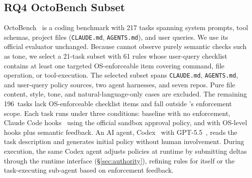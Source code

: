 \subsection{RQ4 OctoBench Subset}
\label{sec:supp:setup:rq4}
OctoBench~\cite{octobench} is a coding benchmark with 217 tasks spanning system prompts, tool schemas, project files (\texttt{CLAUDE.md}, \texttt{AGENTS.md}), and user queries. We use its official evaluator unchanged.
Because \sys{} cannot observe purely semantic checks such as tone, we select a 21-task subset with 61 rules whose user-query checklist contains at least one targeted OS-enforceable item covering command, file operation, or tool-execution.
The selected subset spans \texttt{CLAUDE.md}, \texttt{AGENTS.md}, and user-query policy sources, two agent harnesses, and seven repos.
Pure file content, style, tone, and natural-language-only cases are excluded.
The remaining 196~tasks lack OS-enforceable checklist items and fall outside \sys{}'s enforcement scope.
Each task runs under three conditions: baseline with no enforcement, Claude Code hooks~\cite{anthropic2026hooks} using the official sandbox approval policy, and \sys{} with OS-level hooks plus semantic feedback.
An AI agent, Codex~\cite{openai2025codex} with GPT-5.5~\cite{openai2026gpt55}, reads the task description and generates initial policy without human involvement.
During execution, the same Codex agent adjusts policies at runtime by submitting deltas through the runtime interface (\S\ref{sec:authority}), refining rules for itself or the task-executing sub-agent based on enforcement feedback.

